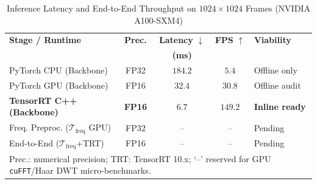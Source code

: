 \begin{table}[t]
\centering
\caption{Inference Latency and End-to-End Throughput on $1024 \times 1024$ Frames (NVIDIA A100-SXM4)}
\label{tab:edge_benchmarks}
\setlength{\tabcolsep}{3.5pt}
\begin{tabular}{l c c c l}
\toprule
\textbf{Stage / Runtime} & \textbf{Prec.} & \textbf{Latency} $\downarrow$ & \textbf{FPS} $\uparrow$ & \textbf{Viability} \\
 & & \textbf{(ms)} & & \\
\midrule
PyTorch CPU (Backbone) & FP32 & $184.2$ & $5.4$ & Offline only \\
PyTorch GPU (Backbone) & FP16 & $32.4$ & $30.8$ & Offline audit \\
\textbf{TensorRT C++ (Backbone)} & \textbf{FP16} & $\mathbf{6.7}$ & $\mathbf{149.2}$ & \textbf{Inline ready} \\
\midrule
Freq. Preproc. ($\mathcal{T}_{\text{freq}}$ GPU) & FP32 & -- & -- & Pending \\
End-to-End ($\mathcal{T}_{\text{freq}}$+TRT) & FP16 & -- & -- & Pending \\
\bottomrule
\multicolumn{5}{p{0.94\columnwidth}}{\footnotesize Prec.: numerical precision; TRT: TensorRT 10.x; `--' reserved for GPU \texttt{cuFFT}/Haar DWT micro-benchmarks.}
\end{tabular}
\end{table}
